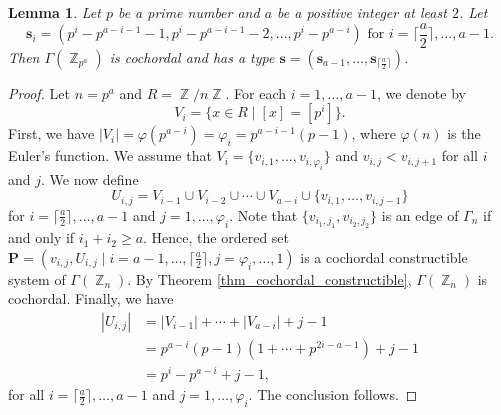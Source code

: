 \documentclass[12pt,amscd]{amsart}
\newtheorem{lem}[thm]{Lemma}
\theoremstyle{definition}
\numberwithin{equation}{section}
\DeclareMathOperator{\ZZ}{\mathbb {Z}}
\def\P {\mathbf P}
\def\s {\mathbf s}
\begin{document}
\begin{lem}\label{lem_cochord_zero_div_1} Let $p$ be a prime number and $a$ be a positive integer at least $2$. Let 
$$\s_i = (p^i - p^{a-i-1}-1, p^i - p^{a-i-1} -2, \ldots, p^i - p^{a-i}) \text{ for } i=\lceil \frac{a}{2} \rceil, \ldots,a-1.$$ 
Then $\Gamma(\ZZ_{p^a})$ is cochordal and has a type $\s = (\s_{a-1}, \ldots, \s_{\lceil \frac{a}{2} \rceil})$.
\end{lem}
\begin{proof} Let $n = p^a$ and $R = \ZZ/n \ZZ$. For each $i = 1, \ldots, a-1$, we denote by 
$$V_i = \{x \in R \mid [x] = [p^i]\}.$$ 
First, we have $|V_i| = \varphi(p^{a-i}) = \varphi_i = p^{a-i-1}(p-1)$, where $\varphi(n)$ is the Euler's function. We assume that $V_i = \{v_{i,1}, \ldots, v_{i,\varphi_i}\}$ and $v_{i,j} < v_{i,j+1}$ for all $i$ and $j$. We now define 
    \begin{equation*}
        U_{i,j} = V_{i-1} \cup V_{i-2} \cup \cdots \cup V_{a -i} \cup \{ v_{i,1}, \ldots, v_{i,j-1} \}
    \end{equation*}
    for $i = \lceil \frac{a}{2} \rceil, \ldots, a-1$ and $j = 1, \ldots, \varphi_i$. Note that $\{v_{i_1,j_1},v_{i_2,j_2}\}$ is an edge of $\Gamma_n$ if and only if $i_1 + i_2 \ge a$. Hence, the ordered set $\P = (v_{i,j},U_{i,j} \mid i = a-1, \ldots, \lceil \frac{a}{2} \rceil, j = \varphi_i, \ldots, 1)$ is a cochordal constructible system of $\Gamma(\ZZ_n)$. By Theorem \ref{thm_cochordal_constructible}, $\Gamma(\ZZ_n)$ is cochordal. Finally, we have 
    \begin{align*}
        |U_{i,j}| & = |V_{i-1}| + \cdots + |V_{a-i}| + j-1\\
                   & = p^{a-i}(p-1) \left ( 1  + \cdots + p^{2i-a-1} \right ) + j - 1 \\
                   & = p^i - p^{a-i}  + j -1,
    \end{align*}
    for all $i = \lceil \frac{a}{2} \rceil, \ldots, a-1$ and $j = 1, \ldots, \varphi_i$. The conclusion follows.
\end{proof}
\end{document}
